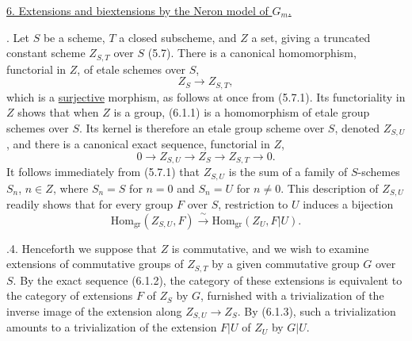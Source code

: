 
\medskip
\noindent\underline{6.  Extensions and biextensions by the Neron model of
$G_m$.}

\medskip
{}.  Let $S$ be a scheme, $T$ a closed subscheme, and $Z$ a set,
giving a truncated constant scheme $Z_{S,T}$ over $S$ (5.7).  There is a
canonical homomorphism, functorial in $Z$, of etale schemes over $S$,
\begin{equation}\tag{6.1.1}
 Z_S\longrightarrow Z_{S,T},
\end{equation}
which is a \underline{surjective} morphism, as follows at once from (5.7.1).
Its functoriality in $Z$ shows that when $Z$ is a group, (6.1.1) is a
homomorphism of etale group schemes over $S$.  Its kernel is therefore an
etale group scheme over $S$, denoted $Z_{S,U}$, and there is a canonical
exact sequence, functorial in $Z$,
\begin{equation}\tag{6.1.2}
 0\longrightarrow Z_{S,U}\longrightarrow Z_S\longrightarrow Z_{S,T}
 \longrightarrow 0.
\end{equation}
It follows immediately from (5.7.1) that $Z_{S,U}$ is the sum of a family of
$S$-schemes $S_n$, $n\in Z$, where $S_n=S$ for $n=0$ and $S_n=U$ for
$n\ne0$.  This description of $Z_{S,U}$ readily shows that for every group
$F$ over $S$, restriction to $U$ induces a bijection
\begin{equation}\tag{6.1.3}
 \mathrm{Hom}_{\mathrm{gr}}(Z_{S,U},F)
 \xrightarrow{\ \sim\ }
 \mathrm{Hom}_{\mathrm{gr}}(Z_U,F|U).
\end{equation}

\medskip
{}.4.  Henceforth we suppose that $Z$ is commutative, and we wish
to examine extensions of commutative groups of $Z_{S,T}$ by a given
commutative group $G$ over $S$.  By the exact sequence (6.1.2), the category
of these extensions is equivalent to the category of extensions $F$ of
$Z_S$ by $G$, furnished with a trivialization of the inverse image of the
extension along $Z_{S,U}\to Z_S$.  By (6.1.3), such a trivialization amounts
to a trivialization of the extension $F|U$ of $Z_U$ by $G|U$.

